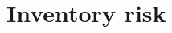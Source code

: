 \documentclass[english,10pt
,aspectratio=169
]{beamer}
\begin{document}
%
%
%
%



\section{Inventory risk}
\end{document}
